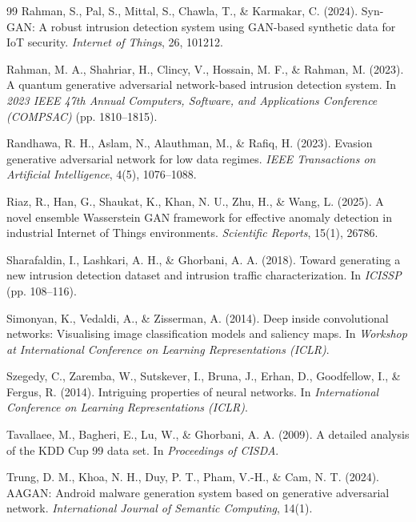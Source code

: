 \documentclass[11pt, a4paper]{article}
\begin{document}
\begin{thebibliography}{99}
Rahman, S., Pal, S., Mittal, S., Chawla, T., \& Karmakar, C. (2024). Syn-GAN: A robust intrusion detection system using GAN-based synthetic data for IoT security. \textit{Internet of Things}, 26, 101212.

Rahman, M. A., Shahriar, H., Clincy, V., Hossain, M. F., \& Rahman, M. (2023). A quantum generative adversarial network-based intrusion detection system. In \textit{2023 IEEE 47th Annual Computers, Software, and Applications Conference (COMPSAC)} (pp. 1810--1815).

Randhawa, R. H., Aslam, N., Alauthman, M., \& Rafiq, H. (2023). Evasion generative adversarial network for low data regimes. \textit{IEEE Transactions on Artificial Intelligence}, 4(5), 1076--1088.

Riaz, R., Han, G., Shaukat, K., Khan, N. U., Zhu, H., \& Wang, L. (2025). A novel ensemble Wasserstein GAN framework for effective anomaly detection in industrial Internet of Things environments. \textit{Scientific Reports}, 15(1), 26786.

Sharafaldin, I., Lashkari, A. H., \& Ghorbani, A. A. (2018). Toward generating a new intrusion detection dataset and intrusion traffic characterization. In \textit{ICISSP} (pp. 108--116).

Simonyan, K., Vedaldi, A., \& Zisserman, A. (2014). Deep inside convolutional networks: Visualising image classification models and saliency maps. In \textit{Workshop at International Conference on Learning Representations (ICLR)}.

Szegedy, C., Zaremba, W., Sutskever, I., Bruna, J., Erhan, D., Goodfellow, I., \& Fergus, R. (2014). Intriguing properties of neural networks. In \textit{International Conference on Learning Representations (ICLR)}.

Tavallaee, M., Bagheri, E., Lu, W., \& Ghorbani, A. A. (2009). A detailed analysis of the KDD Cup 99 data set. In \textit{Proceedings of CISDA}.

Trung, D. M., Khoa, N. H., Duy, P. T., Pham, V.-H., \& Cam, N. T. (2024). AAGAN: Android malware generation system based on generative adversarial network. \textit{International Journal of Semantic Computing}, 14(1).


\end{thebibliography}
\end{document}
